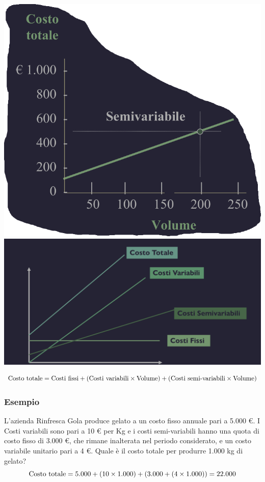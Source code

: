 \documentclass{article}
\begin{document}
\begin{center}
    \includegraphics[scale=0.3]{Image/Costi_SemiVar_1.png}
    \includegraphics[scale=0.3]{Image/Costi_SemiVar_2.png}
\end{center}
\[
    \text{Costo totale} = \text{Costi fissi} + (\text{Costi variabili} \times \text{Volume}) + (\text{Costi semi-variabili} \times \text{Volume})
\]


\subsubsection*{Esempio}
L'azienda Rinfresca Gola produce gelato a un costo fisso annuale pari a 5.000 €. I Costi variabili sono pari a 10 € per Kg e i costi semi-variabili hanno una quota di costo fisso di 3.000 €, che rimane inalterata nel periodo considerato, e un costo variabile unitario pari a 4 €. Quale è il costo totale per produrre 1.000 kg di gelato?
\[
    \text{Costo totale} = 5.000 + (10 \times 1.000) + (3.000 +(4 \times 1.000)) = 22.000
\]
\end{document}
